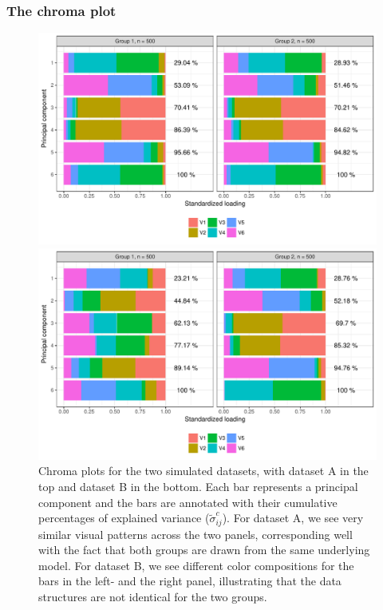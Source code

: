 \documentclass[titlepage,11pt,twoside]{article}
\begin{document}
\subsubsection{The chroma plot}
\begin{figure}
\centerline{\includegraphics[scale = 0.65]{simChroma2.pdf}}
\centerline{\includegraphics[scale = 0.65]{simChroma1.pdf}}
\caption{Chroma plots for the two simulated datasets, with dataset A in the top and dataset B in the bottom. Each bar represents a principal component and the bars are annotated with their cumulative percentages of explained variance ($\tilde\sigma_{ij}^c$). For dataset A, we see very similar visual patterns across the two panels, corresponding well with the fact that both groups are drawn from the same underlying model. For dataset B, we see different color compositions for the bars in the left- and the right panel, illustrating that the data structures are not identical for the two groups.}
\label{plot.simChroma}
\end{figure}
\end{document}
